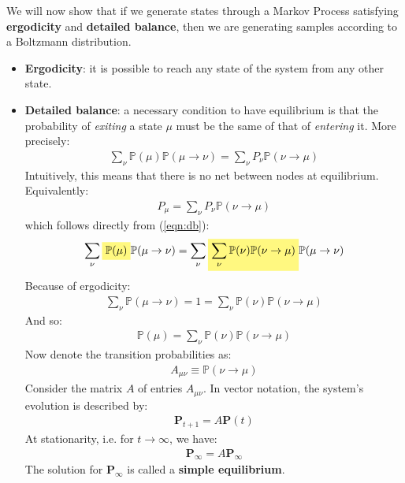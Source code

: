 \documentclass[../template.tex]{subfiles}
\begin{document}
We will now show that if we generate states through a Markov Process satisfying \textbf{ergodicity} and \textbf{detailed balance}, then we are generating samples according to a Boltzmann distribution. 

\begin{itemize}
    \item \textbf{Ergodicity}: it is possible to reach any state of the system from any other state. 
    \item \textbf{Detailed balance}: a necessary condition to have equilibrium is that the probability of \textit{exiting} a state $\mu$ must be the same of that of \textit{entering} it. %
    More precisely:
    \begin{align}\label{eqn:db}
        \sum_\nu \mathbb{P}(\mu) \mathbb{P}(\mu \to \nu)= \sum_\nu P_\nu \mathbb{P}(\nu \to \mu)
    \end{align}  
    Intuitively, this means that there is no net  between nodes at equilibrium. Equivalently:
    \begin{align*}
        P_{\mu} = \sum_{\nu} P_{\nu} \mathbb{P}(\nu \to \mu)
    \end{align*} 
    which follows directly from (\ref{eqn:db}):
    \begin{align*}
        \sum_{\nu} \hlc{Yellow}{\mathbb{P}(\mu)} \mathbb{P}(\mu \to \nu) = \sum_\nu \hlc{Yellow}{ \sum_\nu \mathbb{P}(\nu) \mathbb{P}(\nu \to \mu)} \mathbb{P}(\mu \to \nu)
    \end{align*}
    Because of ergodicity:
    \begin{align*}
        \sum_\nu \mathbb{P}(\mu \to \nu) = 1 = \sum_\nu \mathbb{P}(\nu) \mathbb{P}(\nu \to \mu)
    \end{align*} %
    And so:
    \begin{align*}
        \mathbb{P}(\mu) = \sum_{\nu} \mathbb{P}(\nu) \mathbb{P}(\nu \to \mu)
    \end{align*}
    Now denote the transition probabilities as:
    \begin{align*}
        A_{\mu \nu} \equiv \mathbb{P}(\nu \to \mu)
    \end{align*}
    Consider the matrix $A$ of entries $A_{\mu \nu}$.
    In vector notation, the system's evolution is described by:
    \begin{align*}
        \bm{P}_{t+1} = A \bm{P}(t)
    \end{align*}
    At stationarity, i.e. for $t \to \infty$, we have:
    \begin{align*}
        \bm{P}_{\infty} = A \bm{P}_\infty
    \end{align*}
    The solution for $\bm{P}_\infty$ is called a \textbf{simple equilibrium}. 
    

\end{itemize}
\end{document}
